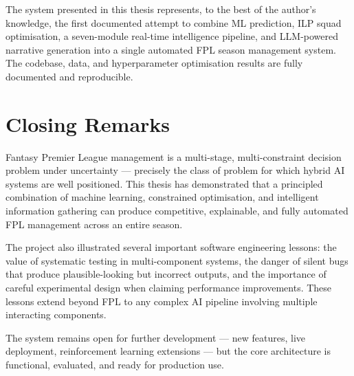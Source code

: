 The system presented in this thesis represents, to the best of the author's knowledge, the first documented attempt to combine ML prediction, ILP squad optimisation, a seven-module real-time intelligence pipeline, and LLM-powered narrative generation into a single automated FPL season management system. The codebase, data, and hyperparameter optimisation results are fully documented and reproducible.

\section{Closing Remarks}

Fantasy Premier League management is a multi-stage, multi-constraint decision problem under uncertainty — precisely the class of problem for which hybrid AI systems are well positioned. This thesis has demonstrated that a principled combination of machine learning, constrained optimisation, and intelligent information gathering can produce competitive, explainable, and fully automated FPL management across an entire season.

The project also illustrated several important software engineering lessons: the value of systematic testing in multi-component systems, the danger of silent bugs that produce plausible-looking but incorrect outputs, and the importance of careful experimental design when claiming performance improvements. These lessons extend beyond FPL to any complex AI pipeline involving multiple interacting components.

The system remains open for further development — new features, live deployment, reinforcement learning extensions — but the core architecture is functional, evaluated, and ready for production use.
